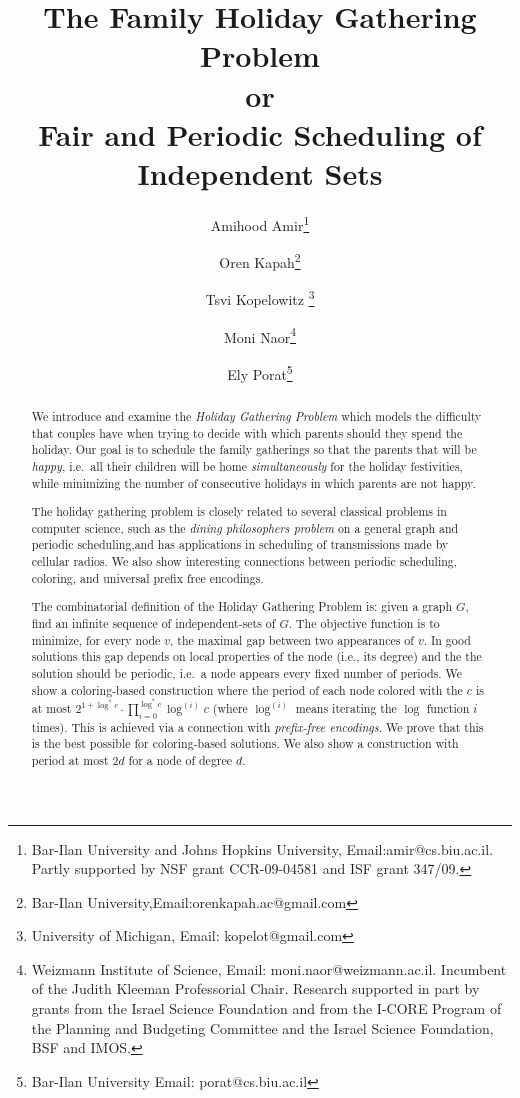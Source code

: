 \documentclass[11pt]{article}
\begin{document}
\title{The Family Holiday Gathering Problem\\ or\\ Fair and Periodic Scheduling of Independent Sets }
\author{
Amihood Amir\thanks{Bar-Ilan University and Johns Hopkins University,
  Email:amir@cs.biu.ac.il. Partly
  supported by  NSF grant CCR-09-04581 and ISF grant 347/09.}\and
Oren Kapah\thanks{Bar-Ilan University,Email:orenkapah.ac@gmail.com}\and
Tsvi Kopelowitz \thanks{University of Michigan, Email: kopelot@gmail.com}\and
Moni Naor\thanks{Weizmann Institute of Science, Email: moni.naor@weizmann.ac.il. Incumbent of the Judith
        Kleeman Professorial Chair. Research supported in part by  grants from the
        Israel Science Foundation and from the
I-CORE Program of the Planning and Budgeting Committee and the Israel Science Foundation, BSF and IMOS.}\and
Ely Porat\thanks{Bar-Ilan University Email: porat@cs.biu.ac.il} }


\date{}

\maketitle

\thispagestyle{empty}
\setcounter{page}{0}

\begin{abstract}

We introduce and examine the {\em Holiday Gathering Problem} which
models the difficulty that couples have when trying to decide with which parents should they spend the holiday.  Our goal is to
schedule the family gatherings so that the parents that will be {\em happy}, i.e.\ all
their children will be home {\em simultaneously} for the holiday festivities, while minimizing the number of consecutive holidays in which parents are not happy.

The holiday gathering problem is closely related to several classical problems in computer science, such as the {\em dining philosophers problem} on a general graph and periodic scheduling,and has applications in scheduling of transmissions made by cellular radios. We also show interesting connections between periodic scheduling, coloring, and universal prefix free encodings.

The combinatorial definition of the Holiday Gathering Problem is: given a graph $G$, find an infinite sequence of independent-sets of $G$. The objective function is to minimize, for every node $v$, the maximal gap between two appearances of $v$.
In good solutions this gap depends on local properties of the node (i.e., its degree) and the the solution should be periodic, i.e.\ a node appears every fixed number of periods. We show a coloring-based construction where the period of each node colored with the $c$ is at most $2^{1+\log^*c}\cdot\prod_{i=0}^{\log^*c} \log^{(i)}c$ (where
$\log^{(i)}$ means iterating the $\log$ function $i$ times). This is achieved via a connection with {\it prefix-free encodings}. We prove that this is the best possible for coloring-based solutions. We also show a construction with period at most $2d$ for a node of degree $d$.





\end{abstract}
\end{document}

